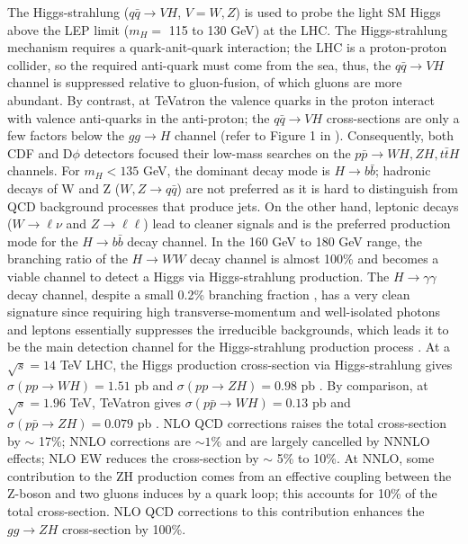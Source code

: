 \documentclass[a4paper,11pt]{article}
\begin{document}
The Higgs-strahlung ($q\bar{q} \rightarrow VH$, $V = W, Z$) is used to probe the light SM Higgs above the LEP limit ($m_H=$ 115 to 130 GeV) at the LHC. The Higgs-strahlung mechanism requires a quark-anit-quark interaction; the LHC is a proton-proton collider, so the required anti-quark must come from the sea, thus, the $q\bar{q} \rightarrow VH$ channel is suppressed relative to gluon-fusion, of which gluons are more abundant. By contrast, at TeVatron the  valence quarks in the proton interact with valence anti-quarks in the anti-proton; the $q\bar{q} \rightarrow VH$ cross-sections are only a few factors below the $gg \rightarrow H$ channel (refer to Figure 1 in \cite{Buescher:2005re}). Consequently, both CDF and D$\phi$ detectors focused their low-mass searches on the $p\bar{p} \rightarrow WH, ZH, t\bar{t}H$ channels. For $m_H < 135$ GeV, the dominant decay mode is $H \rightarrow b \bar{b}$; hadronic decays of W and Z ($W,Z \rightarrow q\bar{q}$) are not preferred as it is hard to distinguish from QCD background processes that produce jets. On the other hand, leptonic decays ($W \rightarrow \ell \nu$ and $Z \rightarrow \ell \ell$) lead to cleaner signals and is the preferred production mode for the $H \rightarrow b\bar{b}$ decay channel. In the 160 GeV to 180 GeV range, the branching ratio of the $H \rightarrow WW $ decay channel is almost 100\% and becomes a viable channel to detect a Higgs via Higgs-strahlung production. The $H \rightarrow\gamma\gamma$ decay channel, despite a small 0.2\% branching fraction \cite{Jones:2023uzh}, has a very clean signature since requiring high transverse-momentum and well-isolated photons and leptons essentially suppresses the irreducible backgrounds, which leads it to be the main detection channel for the Higgs-strahlung production process \cite{Djouadi:2005gi}. At a $\sqrt{s}=14$ TeV LHC, the Higgs production cross-section via Higgs-strahlung gives $\sigma(pp\rightarrow WH) = 1.51$ pb and $\sigma(pp\rightarrow ZH) = 0.98$ pb \cite{LHCHiggsCrossSectionWorkingGroup:2016ypw}. By comparison, at $\sqrt{s} = 1.96$ TeV, TeVatron gives $\sigma(p\bar{p}\rightarrow WH) = 0.13$ pb and $\sigma(p\bar{p}\rightarrow ZH) = 0.079$ pb \cite{TEVNPHTevatronNewPhenomina:2012tcc}. NLO QCD corrections raises the total cross-section by $\sim$ 17\%; NNLO corrections are $\sim 1\%$ and are largely cancelled by NNNLO effects; NLO EW reduces the cross-section by $\sim$ 5\% to 10\%\cite{Jones:2023uzh}. At NNLO, some contribution to the ZH production comes from an effective coupling between the Z-boson and two gluons induces by a quark loop; this accounts for 10\% of the total cross-section\cite{Brein:2003wg}. NLO QCD corrections to this contribution enhances the $gg \rightarrow ZH$  cross-section by 100\%. 
\end{document}
